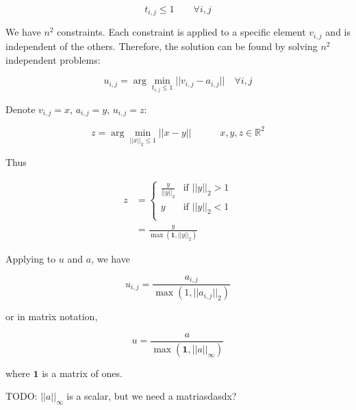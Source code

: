 \documentclass{article}
\begin{document}
\begin{equation}
    t_{i,j} \leq 1  \quad  \quad  \forall i, j
\end{equation}



We have $n^2$ constraints.
Each constraint is applied to a specific element $v_{i,j}$ and is independent of the others.
Therefore, the solution can be found by solving $n^2$ independent problems:

\begin{equation}
u_{i,j} = \arg \min_{t_{i,j} \leq 1} || v_{i,j} - a_{i,j} ||  \quad \forall i, j
\end{equation}

Denote $v_{i,j} = x$, $a_{i,j} = y$, $u_{i,j} = z$:

\begin{equation}
    z = \arg \min_{|| x ||_2 \leq 1} ||x - y|| \quad \quad \quad x, y, z \in \mathbb{R}^2
\end{equation}

Thus


\begin{equation}
    \begin{aligned}
    z & =
    \begin{cases}
        \frac{y}{||y||_2} & \text{if } ||y||_2 > 1 \\
        y & \text{if } ||y||_2 < 1 \\
    \end{cases} \\
    & = \frac{y}{\max(\mathbf{1}, ||y||_2)}
    \end{aligned}
\end{equation}



Applying to $u$ and $a$, we have

\begin{equation}
    u_{i,j} = \frac{a_{i,j}}{\max(1, ||a_{i,j}||_2)}
\end{equation}

or in matrix notation,

\begin{equation}
    u = \frac{a}{\max(\mathbf{1}, ||a||_\infty)}
\end{equation}

where $\mathbf{1}$ is a matrix of ones.

TODO: $||a||_\infty$ is a scalar, but we need a matriasdasdx?


\printbibliography
\end{document}
